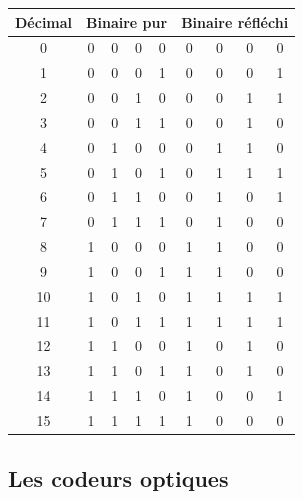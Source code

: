\documentclass[10pt]{article}
\begin{document}
\begin{minipage}[c]{.4\linewidth}
\begin{center}
\begin{tabular}{|c|cccc|cccc|}
\hline
Décimal & \multicolumn{4}{c|}{Binaire pur} &\multicolumn{4}{c|}{Binaire réfléchi} \\
\hline
\hline
0 & 0 & 0 & 0 & 0 & 0 & 0 & 0 & 0 \\ \hline
1 & 0 & 0 & 0 & 1 & 0 & 0 & 0 & 1 \\ \hline\hline
2 & 0 & 0 & 1 & 0 & 0 & 0 & 1 & 1 \\ \hline
3 & 0 & 0 & 1 & 1 & 0 & 0 & 1 & 0 \\ \hline\hline
4 & 0 & 1 & 0 & 0 & 0 & 1 & 1 & 0 \\ \hline
5 & 0 & 1 & 0 & 1 & 0 & 1 & 1 & 1 \\ \hline
6 & 0 & 1 & 1 & 0 & 0 & 1 & 0 & 1 \\ \hline
7 & 0 & 1 & 1 & 1 & 0 & 1 & 0 & 0 \\ \hline\hline
8 & 1 & 0 & 0 & 0 & 1 & 1 & 0 & 0 \\ \hline
9 & 1 & 0 & 0 & 1 & 1 & 1 & 0 & 0 \\ \hline
10 & 1 & 0 & 1 & 0 & 1 & 1 & 1 & 1 \\ \hline
11 & 1 & 0 & 1 & 1 & 1 & 1 & 1 & 1 \\ \hline
12 & 1 & 1 & 0 & 0 & 1 & 0 & 1 & 0 \\ \hline
13 & 1 & 1 & 0 & 1 & 1 & 0 & 1 & 0 \\ \hline
14 & 1 & 1 & 1 & 0 & 1 & 0 & 0 & 1 \\ \hline
15 & 1 & 1 & 1 & 1 & 1 & 0 & 0 & 0 \\ \hline
\end{tabular}
\end{center}
\end{minipage}

\subsection{Les codeurs optiques}
\end{document}
